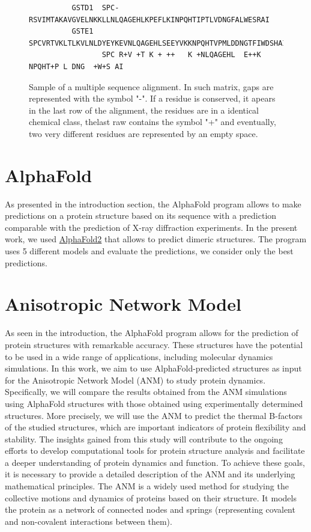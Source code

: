 \begin{figure}
	\label{MSA sample}
	\begin{verbatim}
          GSTD1  SPC-RSVIMTAKAVGVELNKKLLNLQAGEHLKPEFLKINPQHTIPTLVDNGFALWESRAI
          GSTE1  SPCVRTVKLTLKVLNLDYEYKEVNLQAGEHLSEEYVKKNPQHTVPMLDDNGTFIWDSHAI
                 SPC R+V +T K + ++   K +NLQAGEHL  E++K NPQHT+P L DNG  +W+S AI
	\end{verbatim}	
	\caption{Sample of a multiple sequence alignment. In such matrix, gaps are represented with the symbol "-". If a residue is conserved, it apears in the last row of the alignment, the residues are in a identical chemical class, thelast raw contains the symbol "+" and eventually, two very different residues are represented by an empty space.}
\end{figure}

\section{AlphaFold}
\noindent As presented in the introduction section, the AlphaFold program allows to make predictions on a protein structure based on its sequence with a prediction comparable with the prediction of X-ray diffraction experiments. In the present work, we used \href{https://colab.research.google.com/github/sokrypton/ColabFold/blob/main/AlphaFold2.ipynb#scrollTo=kOblAo-xetgx}{AlphaFold2} that allows to predict dimeric structures. The program uses 5 different models and evaluate the predictions, we consider only the best predictions.

\section{Anisotropic Network Model}
As seen in the introduction, the AlphaFold program allows for the prediction of protein structures with remarkable accuracy. These structures have the potential to be used in a wide range of applications, including molecular dynamics simulations. In this work, we aim to use AlphaFold-predicted structures as input for the Anisotropic Network Model (ANM) to study protein dynamics. Specifically, we will compare the results obtained from the ANM simulations using AlphaFold structures with those obtained using experimentally determined structures. More precisely, we will use the ANM to predict the thermal B-factors of the studied structures\cite{ANM-COM}, which are important indicators of protein flexibility and stability. The insights gained from this study will contribute to the ongoing efforts to develop computational tools for protein structure analysis and facilitate a deeper understanding of protein dynamics and function. To achieve these goals, it is necessary to provide a detailed description of the ANM and its underlying mathematical principles. The ANM is a widely used method for studying the collective motions and dynamics of proteins based on their structure. It models the protein as a network of connected nodes and springs (representing covalent and non-covalent interactions between them). 

